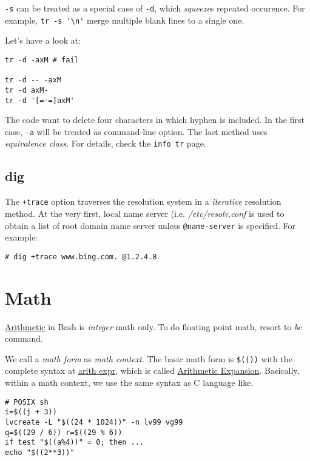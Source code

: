 \lstinline|-s| can be treated as a special case of \lstinline|-d|,
which \textit{squeeze}s repeated occurence. For example,
\lstinline|tr -s '\n'| merge multiple blank lines to a single one.

Let's have a look at:

\begin{lstlisting}
tr -d -axM # fail

tr -d -- -axM
tr -d axM-
tr -d '[=-=]axM'
\end{lstlisting}

The code want to delete four characters in which hyphen is
included. In the first case, \lstinline|-a| will be treated as
command-line option. The last method uses \textit{equivalence
  class}. For details, check the \lstinline|info tr| page.

\subsection{dig}
\label{sec:bash-dig}

The \lstinline|+trace| option traverses the resolution system in a
\textit{iterative} resolution method. At the very first, local
name server (i.e. \textit{/etc/resolv.conf} is used to obtain a
list of root domain name server unless \lstinline|@name-server| is
specified. For example:

\begin{lstlisting}
# dig +trace www.bing.com. @1.2.4.8
\end{lstlisting}

\section{Math}
\label{sec:bash-math}

\href{http://mywiki.wooledge.org/ArithmeticExpression}{Arithmetic}
in Bash is \textit{integer} math only. To do floating point math,
resort to \textit{bc} command.

We call a \textit{math form} as \textit{math context}. The basic
math form is
\lstinline|$(())| with the complete syntax at
\href{https://wiki.bash-hackers.org/syntax/arith_expr}{arith expr},
which is called \uline{Arithmetic Expansion}. Basically, within a
math context, we use the same syntax as C language like.

\begin{minipage}{1.0\linewidth}
\begin{lstlisting}
# POSIX sh
i=$((j + 3))
lvcreate -L "$((24 * 1024))" -n lv99 vg99
q=$((29 / 6)) r=$((29 % 6))
if test "$((a%4))" = 0; then ...
echo "$((2**3))"
\end{lstlisting}
\end{minipage}

